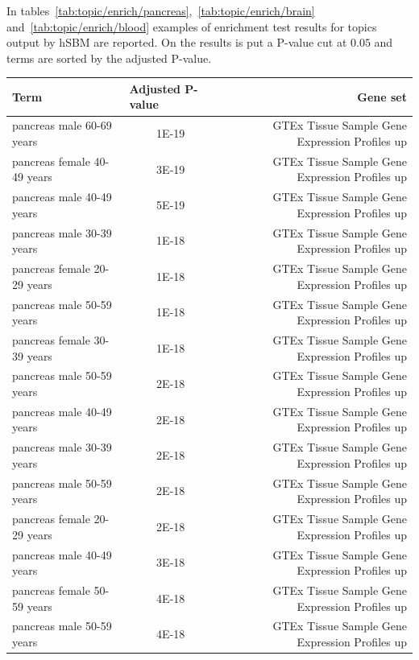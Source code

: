 In tables~\ref{tab:topic/enrich/pancreas},~\ref{tab:topic/enrich/brain} and~\ref{tab:topic/enrich/blood} examples of enrichment test results for topics output by hSBM are reported. On the results is put a P-value cut at $0.05$ and terms are sorted by the adjusted P-value.
\begin{table}[htb!]
	\tiny
	\begin{center}
		\begin{tabular}{|l|c|r|}
			\hline
			Term & \multicolumn{1}{l|}{Adjusted P-value} & Gene set \\ \hline
			pancreas male 60-69 years & 1E-19 & GTEx Tissue Sample Gene Expression Profiles up \\ \hline
			pancreas female 40-49 years & 3E-19 & GTEx Tissue Sample Gene Expression Profiles up \\ \hline
			pancreas male 40-49 years & 5E-19 & GTEx Tissue Sample Gene Expression Profiles up \\ \hline
			pancreas male 30-39 years & 1E-18 & GTEx Tissue Sample Gene Expression Profiles up \\ \hline
			pancreas female 20-29 years & 1E-18 & GTEx Tissue Sample Gene Expression Profiles up \\ \hline
			pancreas male 50-59 years & 1E-18 & GTEx Tissue Sample Gene Expression Profiles up \\ \hline
			pancreas female 30-39 years & 1E-18 & GTEx Tissue Sample Gene Expression Profiles up \\ \hline
			pancreas male 50-59 years & 2E-18 & GTEx Tissue Sample Gene Expression Profiles up \\ \hline
			pancreas male 40-49 years & 2E-18 & GTEx Tissue Sample Gene Expression Profiles up \\ \hline
			pancreas male 30-39 years & 2E-18 & GTEx Tissue Sample Gene Expression Profiles up \\ \hline
			pancreas male 50-59 years & 2E-18 & GTEx Tissue Sample Gene Expression Profiles up \\ \hline
			pancreas female 20-29 years & 2E-18 & GTEx Tissue Sample Gene Expression Profiles up \\ \hline
			pancreas male 40-49 years & 3E-18 & GTEx Tissue Sample Gene Expression Profiles up \\ \hline
			pancreas female 50-59 years & 4E-18 & GTEx Tissue Sample Gene Expression Profiles up \\ \hline
			pancreas male 50-59 years & 4E-18 & GTEx Tissue Sample Gene Expression Profiles up \\ \hline

\end{tabular}
\end{center}
\end{table}
